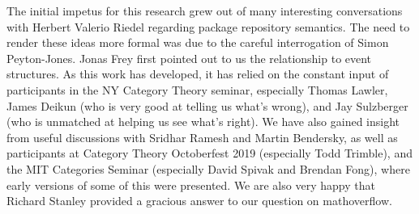 \documentclass[hoptionsi,review,screen,format=acmsmall]{acmart}
\theoremstyle{definition}
\begin{document}




%






\begin{acks}
The initial impetus for this research grew out of many interesting conversations with Herbert Valerio Riedel regarding package repository semantics. The need to render these ideas more formal was due to the careful interrogation of Simon Peyton-Jones. Jonas Frey first pointed out to us the relationship to event structures. As this work has developed, it has relied on the constant input of participants in the NY Category Theory seminar, especially Thomas Lawler, James Deikun (who is very good at telling us what's wrong), and Jay Sulzberger (who is unmatched at helping us see what's right). We have also gained insight from useful discussions with Sridhar Ramesh and Martin Bendersky, as well as participants at Category Theory Octoberfest 2019 (especially Todd Trimble), and the MIT Categories Seminar (especially David Spivak and Brendan Fong), where early versions of some of this were presented. We are also very happy that Richard Stanley provided a gracious answer to our question on mathoverflow.
\end{acks}


\newpage
 \nocite{*}
%  
 
\end{document}
